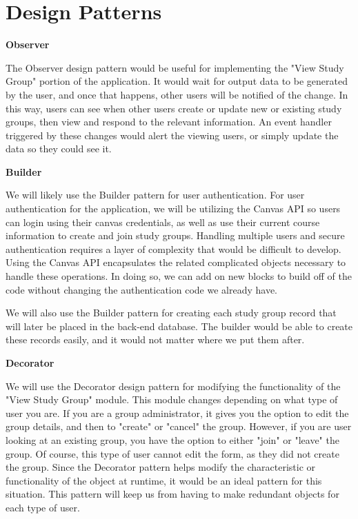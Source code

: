 \documentclass[12pt,letterpaper]{article}
\begin{document}
\section{Design Patterns}
\textbf{Observer}

The Observer design pattern would be useful for implementing the "View Study Group" portion of the application. It would wait for output data to be generated by the user, and once that happens, other users will be notified of the change. In this way, users can see when other users create or update new or existing study groups, then view and respond to the relevant information. An event handler triggered by these changes would alert the viewing users, or simply update the data so they could see it. 

\textbf{Builder}

We will likely use the Builder pattern for user authentication. For user authentication for the application, we will be utilizing the Canvas API so users can login using their canvas credentials, as well as use their current course information to create and join study groups. Handling multiple users and secure authentication requires a layer of complexity that would be difficult to develop. Using the Canvas API encapsulates the related complicated objects necessary to handle these operations. In doing so, we can add on new blocks to build off of the code without changing the authentication code we already have. 

We will also use the Builder pattern for creating each study group record that will later be placed in the back-end database. The builder would be able to create these records easily, and it would not matter where we put them after. 

\textbf{Decorator}

We will use the Decorator design pattern for modifying the functionality of the "View Study Group" module. This module changes depending on what type of user you are. If you are a group administrator, it gives you the option to edit the group details, and then to "create" or "cancel" the group. However, if you are user looking at an existing group, you have the option to either "join" or "leave" the group. Of course, this type of user cannot edit the form, as they did not create the group. Since the Decorator pattern helps modify the characteristic or functionality of the object at runtime, it would be an ideal pattern for this situation. This pattern will keep us from having to make redundant objects for each type of user.
\end{document}
